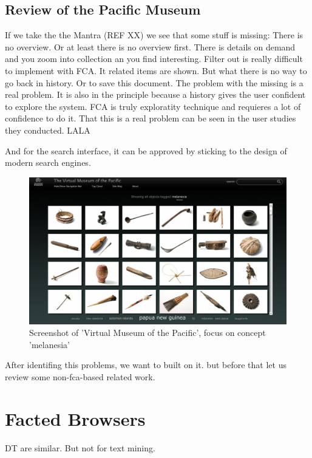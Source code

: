 \documentclass[11pt]{report}
\begin{document}
 \subsection{Review of the Pacific Museum}
 
 If we take the the Mantra (REF XX) we see that some stuff is missing: There is no overview. Or at least there is no overview first. There is details on demand and you zoom into collection an you find interesting. Filter out is really difficult to implement with FCA. It related items are shown. But what there is no way to go back in history. Or to save this document. The problem with the missing is a real problem. It is also in the principle because a history gives the user confident to explore the system. FCA is truly exploratity technique and requieres a lot of confidence to do it. That this is a real problem can be seen in the user studies they conducted. LALA
 
 And for the search interface, it can be approved by sticking to the design of modern search engines.
 
 \begin{figure}[h]
\label{figure:pacific}
	\centering
	\includegraphics[width=\linewidth]{images/pacific}
\caption{Screenshot of 'Virtual Museum of the Pacific', focus on concept 'melanesia'}
\end{figure}
 
 

 
 After identifing this problems, we want to built on it. but before that let us review some non-fca-based related work.


\section{Facted Browsers}

DT are similar. But not for text mining. 
\end{document}
